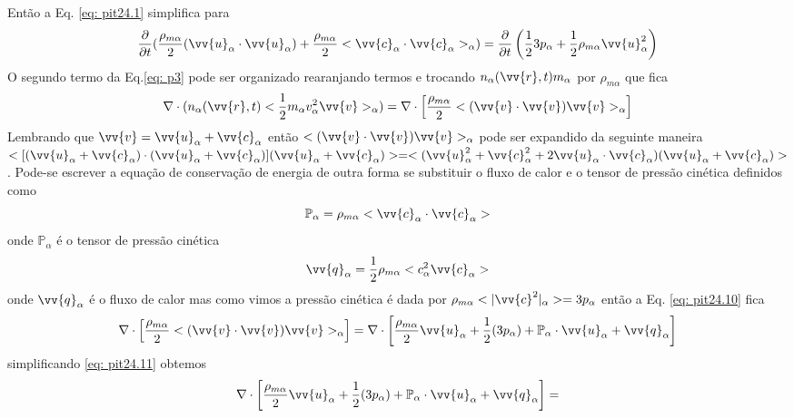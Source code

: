 \documentclass[12pt,oneside,a4paper]{abntex2}
\theoremstyle{definition}  %
\begin{document}
Então a Eq. \ref{eq: pit24.1} simplifica para 
\begin{equation}
\label{eq: pit24.12}
\frac{\partial }{\partial t}(\frac{\rho_{m\alpha}}{2}(\vv{u}_\alpha \cdot \vv{u}_\alpha) + \frac{\rho_{m\alpha}}{2}<\vv{c}_\alpha \cdot \vv{c}_\alpha>_\alpha)=\frac{\partial }{\partial t}  \left( \frac{1}{2} 3p_\alpha+\frac{1}{2} \rho_{m\alpha}\vv{u}^2_\alpha \right) 
\end{equation} 
O segundo termo da Eq.\ref{eq: p3} pode ser organizado rearanjando termos e trocando $ n_\alpha(\vv{r},t) m_\alpha$ por $\rho_{m\alpha}$ que fica
\begin{equation}
\label{eq: pit24.10}
\nabla \cdot (n_\alpha(\vv{r},t)<\frac{1}{2}m_\alpha v_{\alpha}^2 \vv{v} >_\alpha) = \nabla \cdot \left[ \frac{\rho_{m\alpha}}{2}<(\vv{v} \cdot \vv{v})\vv{v}>_\alpha \right]
\end{equation}
Lembrando que $\vv{v} = \vv{u}_\alpha + \vv{c}_\alpha$ então  $<(\vv{v} \cdot \vv{v})\vv{v}>_\alpha$ pode ser expandido da seguinte maneira $
<[(\vv{u}_\alpha + \vv{c}_\alpha) \cdot (\vv{u}_\alpha + \vv{c}_\alpha)](\vv{u}_\alpha + \vv{c}_\alpha)> = <(\vv{u}^2_\alpha + \vv{c}^2_\alpha+2\vv{u}_\alpha \cdot \vv{c}_\alpha)(\vv{u}_\alpha + \vv{c}_\alpha)>$. Pode-se escrever a equação de conservação de energia de outra forma se substituir o fluxo de calor e o tensor de pressão cinética definidos como
\begin{equation}
\mathbb{P}_\alpha = \rho_{m\alpha}<\vv{c}_\alpha \cdot \vv{c}_\alpha> 
\end{equation}
onde $\mathbb{P}_\alpha$ é o tensor de pressão cinética
\begin{equation}
\vv{q}_\alpha = \frac{1}{2} \rho_{m\alpha} <c^2_\alpha  \vv{c}_\alpha>
\end{equation}
onde $\vv{q}_\alpha$ é o fluxo de calor
mas como vimos a pressão cinética é dada por $\rho_{m\alpha}<|\vv{c}^2|_\alpha>=3p_\alpha$ então a Eq. \ref{eq: pit24.10} fica
\begin{equation}
\label{eq: pit24.11}
\nabla \cdot \left[ \frac{\rho_{m\alpha}}{2}<(\vv{v} \cdot \vv{v})\vv{v}>_\alpha \right]= \nabla \cdot \left[ \frac{\rho_{m\alpha}}{2}\vv{u}_\alpha+\frac{1}{2}(3p_\alpha) + \mathbb{P}_\alpha \cdot \vv{u}_\alpha + \vv{q}_\alpha \right]
\end{equation}
simplificando \ref{eq: pit24.11} obtemos
\begin{equation}
\label{eq: pit24.13}
\nabla \cdot \left[ \frac{\rho_{m\alpha}}{2}\vv{u}_\alpha+\frac{1}{2}(3p_\alpha) + \mathbb{P}_\alpha \cdot \vv{u}_\alpha + \vv{q}_\alpha \right] = 
\end{equation} 
\end{document}
